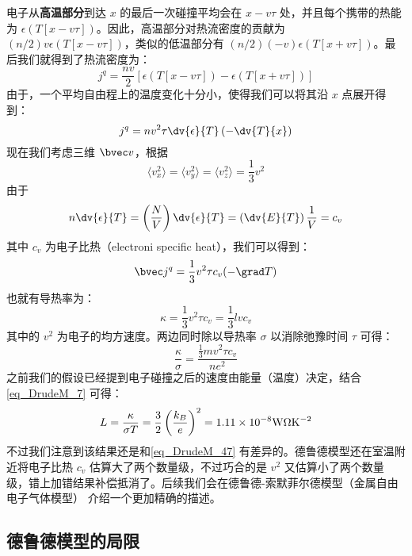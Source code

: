 电子从\textbf{高温部分}到达 $x$ 的最后一次碰撞平均会在 $x-v\tau$ 处，并且每个携带的热能为 $\epsilon(T[x-v\tau])$。因此，高温部分对热流密度的贡献为 $(n/2)v\epsilon(T[x-v\tau])$，类似的低温部分有 $(n/2)(-v)\epsilon(T[x+v\tau])$。最后我们就得到了热流密度为：
\begin{equation}
j^q = \frac{nv}{2}[\epsilon(T[x-v\tau])-\epsilon(T[x+v\tau])]
\end{equation}
由于，一个平均自由程上的温度变化十分小，使得我们可以将其沿 $x$ 点展开得到：
\begin{equation}
j^q = nv^2\tau\dv{\epsilon}{T}\left(-\dv{T}{x}\right)
\end{equation}
现在我们考虑三维 $\bvec v$，根据
\begin{equation}
\langle v_x^2\rangle = \langle v_y^2\rangle=\langle v_z^2 \rangle = \frac{1}{3}v^2
\end{equation}
由于
\begin{equation}
n\dv{\epsilon}{T}=\left(\frac{N}{V}\right)\dv{\epsilon}{T}=\left(\dv{E}{T}\right)\frac{1}{V}=c_v
\end{equation}
其中 $c_v$ 为电子比热（electroni specific heat），我们可以得到：
\begin{equation}
\bvec j^q =\frac{1}{3}v^2\tau c_v(-\grad T)
\end{equation}
也就有导热率为：
\begin{equation}
\kappa=\frac{1}{3}v^2\tau c_v =\frac{1}{3}lvc_v
\end{equation}
其中的 $v^2$ 为电子的均方速度。两边同时除以导热率 $\sigma$ 以消除弛豫时间 $\tau$ 可得：
\begin{equation}
\frac{\kappa}{\sigma}=\frac{\frac{1}{3}mv^2\tau c_v}{ne^2}
\end{equation}
之前我们的假设已经提到电子碰撞之后的速度由能量（温度）决定，结合\autoref{eq_DrudeM_7} 可得：
\begin{equation}
L=\frac{\kappa}{\sigma T}=\frac{3}{2}\left(\frac{k_B}{e}\right)^2 = 1.11\times10^{-8}\rm{W\Omega K^{-2}}
\end{equation}
不过我们注意到该结果还是和\autoref{eq_DrudeM_47} 有差异的。德鲁德模型还在室温附近将电子比热 $c_v$ 估算大了两个数量级，不过巧合的是 $v^2$ 又估算小了两个数量级，错上加错结果补偿抵消了。后续我们会在德鲁德-索默菲尔德模型（金属自由电子气体模型）%
介绍一个更加精确的描述。

\subsection{德鲁德模型的局限}

